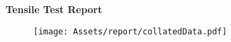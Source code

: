 \documentclass[11pt]{article}
\begin{document}
\begin{center}
    \huge
    \textbf{Tensile Test Report}
\end{center}


\begin{figure}[ht]
    \vspace*{-.0cm}
    \centering
    \texttt{[image: Assets/report/collatedData.pdf]}
    \label{fig:plot}
\end{figure}



\pagebreak
\end{document}
